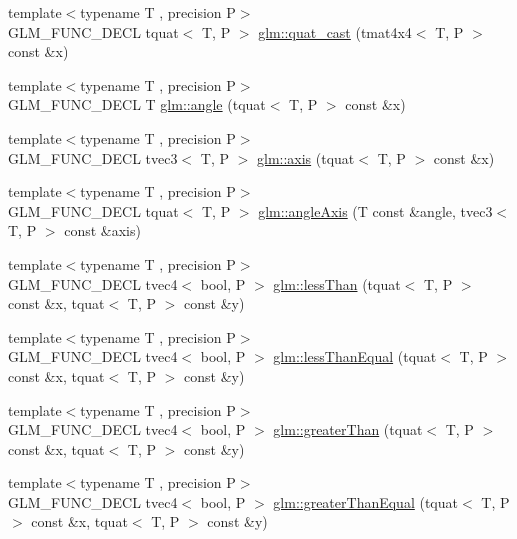 \begin{DoxyCompactItemize}
\item 
{\footnotesize template$<$typename T , precision P$>$ }\\G\-L\-M\-\_\-\-F\-U\-N\-C\-\_\-\-D\-E\-C\-L tquat$<$ T, P $>$ \hyperlink{group__gtc__quaternion_ga3e4615e9884dd0f41f5617b9848a5d9c}{glm\-::quat\-\_\-cast} (tmat4x4$<$ T, P $>$ const \&x)
\item 
{\footnotesize template$<$typename T , precision P$>$ }\\G\-L\-M\-\_\-\-F\-U\-N\-C\-\_\-\-D\-E\-C\-L T \hyperlink{group__gtc__quaternion_gad4a4448baedb198b2b1e7880d2544dc9}{glm\-::angle} (tquat$<$ T, P $>$ const \&x)
\item 
{\footnotesize template$<$typename T , precision P$>$ }\\G\-L\-M\-\_\-\-F\-U\-N\-C\-\_\-\-D\-E\-C\-L tvec3$<$ T, P $>$ \hyperlink{group__gtc__quaternion_ga0b3e87a13b2708154b72259e50789a19}{glm\-::axis} (tquat$<$ T, P $>$ const \&x)
\item 
{\footnotesize template$<$typename T , precision P$>$ }\\G\-L\-M\-\_\-\-F\-U\-N\-C\-\_\-\-D\-E\-C\-L tquat$<$ T, P $>$ \hyperlink{group__gtc__quaternion_ga37ae19405f1ccf766f27e4fcd035d859}{glm\-::angle\-Axis} (T const \&angle, tvec3$<$ T, P $>$ const \&axis)
\item 
{\footnotesize template$<$typename T , precision P$>$ }\\G\-L\-M\-\_\-\-F\-U\-N\-C\-\_\-\-D\-E\-C\-L tvec4$<$ bool, P $>$ \hyperlink{group__gtc__quaternion_ga91a40d16a3b5bb47d71ac1a3fb688ffa}{glm\-::less\-Than} (tquat$<$ T, P $>$ const \&x, tquat$<$ T, P $>$ const \&y)
\item 
{\footnotesize template$<$typename T , precision P$>$ }\\G\-L\-M\-\_\-\-F\-U\-N\-C\-\_\-\-D\-E\-C\-L tvec4$<$ bool, P $>$ \hyperlink{group__gtc__quaternion_ga7c81996ed2724f26fe76faf352c76294}{glm\-::less\-Than\-Equal} (tquat$<$ T, P $>$ const \&x, tquat$<$ T, P $>$ const \&y)
\item 
{\footnotesize template$<$typename T , precision P$>$ }\\G\-L\-M\-\_\-\-F\-U\-N\-C\-\_\-\-D\-E\-C\-L tvec4$<$ bool, P $>$ \hyperlink{group__gtc__quaternion_ga09d21a588ae425ac7517ea65cc59a5ae}{glm\-::greater\-Than} (tquat$<$ T, P $>$ const \&x, tquat$<$ T, P $>$ const \&y)
\item 
{\footnotesize template$<$typename T , precision P$>$ }\\G\-L\-M\-\_\-\-F\-U\-N\-C\-\_\-\-D\-E\-C\-L tvec4$<$ bool, P $>$ \hyperlink{group__gtc__quaternion_ga0906a221a2037519fcf316ea5c1e3b3e}{glm\-::greater\-Than\-Equal} (tquat$<$ T, P $>$ const \&x, tquat$<$ T, P $>$ const \&y)

\end{DoxyCompactItemize}
